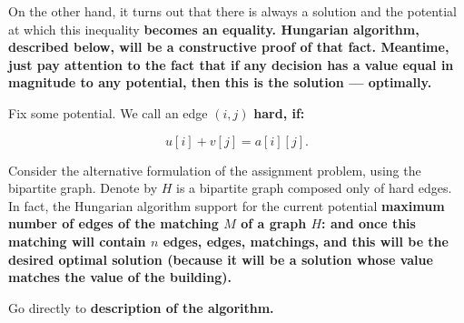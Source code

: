 On the other hand, it turns out that there is always a solution and the potential at which this inequality \bf{becomes an equality}. Hungarian algorithm, described below, will be a constructive proof of that fact. Meantime, just pay attention to the fact that if any decision has a value equal in magnitude to any potential, then this is the solution --- \bf{optimally}.

Fix some potential. We call an edge $(i,j)$ \bf{hard}, if:

$$ u[i] + v[j] = a[i][j]. $$

Consider the alternative formulation of the assignment problem, using the bipartite graph. Denote by $H$ is a bipartite graph composed only of hard edges. In fact, the Hungarian algorithm support for the current potential \bf{maximum number of edges of the matching $M$} of a graph $H$: and once this matching will contain $n$ edges, edges, matchings, and this will be the desired optimal solution (because it will be a solution whose value matches the value of the building).

Go directly to \bf{description of the algorithm}.

